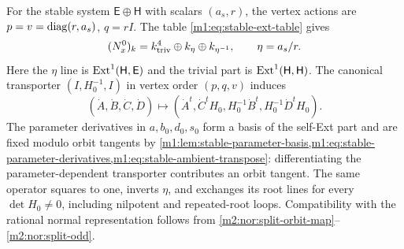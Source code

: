For the stable system $\mathsf E\oplus\mathsf H$ with scalars
$(a_s,r)$, the vertex actions are $p=v=\operatorname{diag}(r,a_s)$, $q=rI$.
The table \eqref{m1:eq:stable-ext-table} gives
\begin{equation}\label{m2:nor:stable-ext-table}
 (N_x^0)_k=k^4_{\mathrm{triv}}\oplus k_\eta\oplus k_{\eta^{-1}},
 \qquad\eta=a_s/r.
\end{equation}
Here the $\eta$ line is $\operatorname{Ext}^1(\mathsf H,\mathsf E)$ and the
trivial part is $\operatorname{Ext}^1(\mathsf H,\mathsf H)$. The canonical
transporter $(I,H_0^{-1},I)$ in vertex order $(p,q,v)$ induces
\begin{equation}\label{m2:nor:stable-odd-geometric}
 (\dot A,\dot B,\dot C,\dot D)\longmapsto
 (\dot A^t,\dot C^tH_0,H_0^{-1}\dot B^t,H_0^{-1}\dot D^tH_0).
\end{equation}
The parameter derivatives in $a,b_0,d_0,s_0$ form a basis of the
self-Ext part and are fixed modulo orbit tangents by
\cref{m1:lem:stable-parameter-basis,m1:eq:stable-parameter-derivatives,m1:eq:stable-ambient-transpose}:
differentiating the parameter-dependent transporter contributes an
orbit tangent. The same operator squares to one, inverts $\eta$,
and exchanges its root lines for every $\det H_0\ne0$, including
nilpotent and repeated-root loops. Compatibility with the rational normal representation
follows from \eqref{m2:nor:split-orbit-map}--\eqref{m2:nor:split-odd}.


